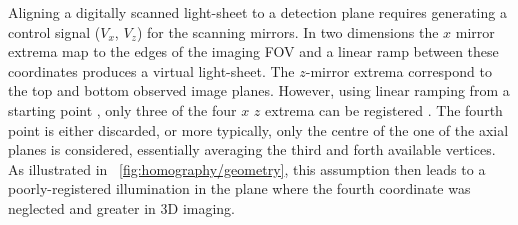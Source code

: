 Aligning a digitally scanned light-sheet to a detection plane requires generating %
a control signal ($V_x$, $V_z$) for the scanning mirrors.
In two dimensions the \(x\) mirror extrema map to the edges of the imaging \gls{FOV} and a linear ramp between these coordinates produces a virtual light-sheet.
The \(z\)-mirror extrema correspond to the top and bottom observed image planes.
However, using linear ramping from a starting point%
, only three of the four $x$ $z$ extrema %
can be registered
\cite{zitova_image_2003-1}.
The fourth point is either discarded, or more typically, only the centre of the one of the axial planes is considered, essentially averaging the third and forth available vertices. %
As illustrated in \figurename~\ref{fig:homography/geometry}, this assumption then leads to a poorly-registered illumination in the plane where the fourth coordinate was neglected and greater  in \gls{3D} imaging.%



